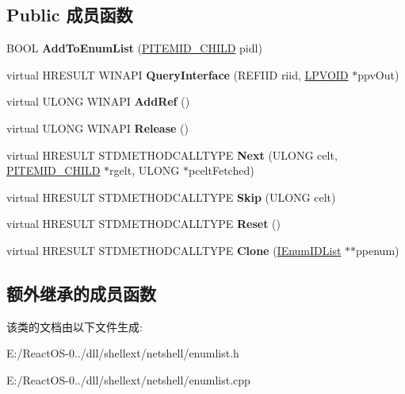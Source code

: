 \subsection*{Public 成员函数}
\begin{DoxyCompactItemize}
\item 
\mbox{\label{class_c_enum_i_d_list_a727a41e4abeb339f851b3db88631a58c}} 
B\+O\+OL {\bfseries Add\+To\+Enum\+List} (\hyperlink{struct___i_t_e_m_i_d___c_h_i_l_d}{P\+I\+T\+E\+M\+I\+D\+\_\+\+C\+H\+I\+LD} pidl)
\item 
\mbox{\label{class_c_enum_i_d_list_aef51b948ce7c1cbea1e7be37f51115a1}} 
virtual H\+R\+E\+S\+U\+LT W\+I\+N\+A\+PI {\bfseries Query\+Interface} (R\+E\+F\+I\+ID riid, \hyperlink{interfacevoid}{L\+P\+V\+O\+ID} $\ast$ppv\+Out)
\item 
\mbox{\label{class_c_enum_i_d_list_a4b226fa8e572db95d6bd50fead47783a}} 
virtual U\+L\+O\+NG W\+I\+N\+A\+PI {\bfseries Add\+Ref} ()
\item 
\mbox{\label{class_c_enum_i_d_list_a613cf903e83564562daa4377de728904}} 
virtual U\+L\+O\+NG W\+I\+N\+A\+PI {\bfseries Release} ()
\item 
\mbox{\label{class_c_enum_i_d_list_a593a034996234b697bb2f321e4cd4ecb}} 
virtual H\+R\+E\+S\+U\+LT S\+T\+D\+M\+E\+T\+H\+O\+D\+C\+A\+L\+L\+T\+Y\+PE {\bfseries Next} (U\+L\+O\+NG celt, \hyperlink{struct___i_t_e_m_i_d___c_h_i_l_d}{P\+I\+T\+E\+M\+I\+D\+\_\+\+C\+H\+I\+LD} $\ast$rgelt, U\+L\+O\+NG $\ast$pcelt\+Fetched)
\item 
\mbox{\label{class_c_enum_i_d_list_a96388ccf7fb46d57a0bac469775a779c}} 
virtual H\+R\+E\+S\+U\+LT S\+T\+D\+M\+E\+T\+H\+O\+D\+C\+A\+L\+L\+T\+Y\+PE {\bfseries Skip} (U\+L\+O\+NG celt)
\item 
\mbox{\label{class_c_enum_i_d_list_a0608c971027ac78f6c40759347a56318}} 
virtual H\+R\+E\+S\+U\+LT S\+T\+D\+M\+E\+T\+H\+O\+D\+C\+A\+L\+L\+T\+Y\+PE {\bfseries Reset} ()
\item 
\mbox{\label{class_c_enum_i_d_list_a896e66269b960e9d25d4dd6836a96b00}} 
virtual H\+R\+E\+S\+U\+LT S\+T\+D\+M\+E\+T\+H\+O\+D\+C\+A\+L\+L\+T\+Y\+PE {\bfseries Clone} (\hyperlink{interface_i_enum_i_d_list}{I\+Enum\+I\+D\+List} $\ast$$\ast$ppenum)
\end{DoxyCompactItemize}
\subsection*{额外继承的成员函数}


该类的文档由以下文件生成\+:\begin{DoxyCompactItemize}
\item 
E\+:/\+React\+O\+S-\/0../dll/shellext/netshell/enumlist.\+h\item 
E\+:/\+React\+O\+S-\/0../dll/shellext/netshell/enumlist.\+cpp\end{DoxyCompactItemize}
